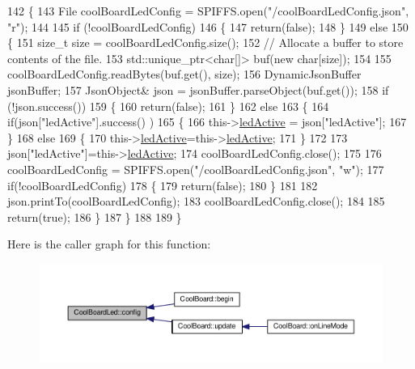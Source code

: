 \begin{DoxyCode}
142 \{
143     File coolBoardLedConfig = SPIFFS.open(\textcolor{stringliteral}{"/coolBoardLedConfig.json"}, \textcolor{stringliteral}{"r"});
144 
145     \textcolor{keywordflow}{if} (!coolBoardLedConfig) 
146     \{
147         \textcolor{keywordflow}{return}(\textcolor{keyword}{false});
148     \}
149     \textcolor{keywordflow}{else}
150     \{
151         \textcolor{keywordtype}{size\_t} size = coolBoardLedConfig.size();
152         \textcolor{comment}{// Allocate a buffer to store contents of the file.}
153         std::unique\_ptr<char[]> buf(\textcolor{keyword}{new} \textcolor{keywordtype}{char}[size]);
154 
155         coolBoardLedConfig.readBytes(buf.get(), size);
156         DynamicJsonBuffer jsonBuffer;
157         JsonObject& json = jsonBuffer.parseObject(buf.get());
158         \textcolor{keywordflow}{if} (!json.success()) 
159         \{
160               \textcolor{keywordflow}{return}(\textcolor{keyword}{false});
161         \} 
162         \textcolor{keywordflow}{else}
163         \{     
164             \textcolor{keywordflow}{if}(json[\textcolor{stringliteral}{"ledActive"}].success() )
165             \{
166                 this->\hyperlink{classCoolBoardLed_a5f17c135516fcf4b44ea8a096ba0177a}{ledActive} = json[\textcolor{stringliteral}{"ledActive"}]; 
167             \}
168             \textcolor{keywordflow}{else}
169             \{
170                 this->\hyperlink{classCoolBoardLed_a5f17c135516fcf4b44ea8a096ba0177a}{ledActive}=this->\hyperlink{classCoolBoardLed_a5f17c135516fcf4b44ea8a096ba0177a}{ledActive};          
171             \}
172             
173             json[\textcolor{stringliteral}{"ledActive"}]=this->\hyperlink{classCoolBoardLed_a5f17c135516fcf4b44ea8a096ba0177a}{ledActive};
174             coolBoardLedConfig.close();
175             
176             coolBoardLedConfig = SPIFFS.open(\textcolor{stringliteral}{"/coolBoardLedConfig.json"}, \textcolor{stringliteral}{"w"});
177             \textcolor{keywordflow}{if}(!coolBoardLedConfig)
178             \{
179                 \textcolor{keywordflow}{return}(\textcolor{keyword}{false});          
180             \}
181 
182             json.printTo(coolBoardLedConfig);
183             coolBoardLedConfig.close();
184 
185               \textcolor{keywordflow}{return}(\textcolor{keyword}{true}); 
186         \}
187     \}   
188 
189 \}               
\end{DoxyCode}
Here is the caller graph for this function\+:
\nopagebreak
\begin{figure}[H]
\begin{center}
\leavevmode
\includegraphics[width=350pt]{classCoolBoardLed_a1b60e5e30bea96c49ed62ed1bf1ffc8b_icgraph}
\end{center}
\end{figure}
